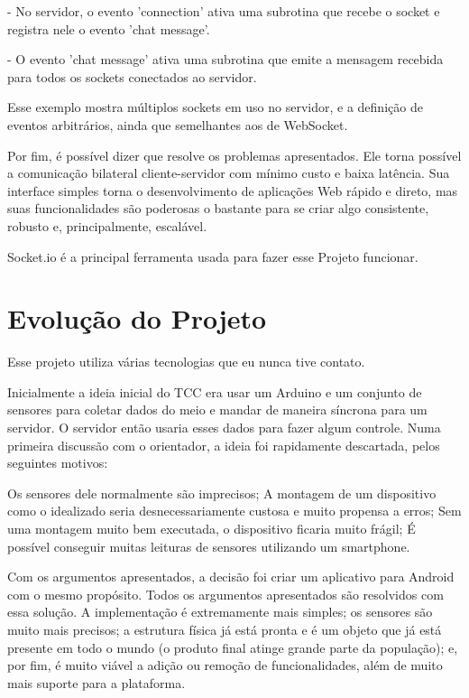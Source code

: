 \documentclass[a4paper,12pt]{article}
\begin{document}
- No servidor, o evento 'connection' ativa uma subrotina que recebe o socket e registra nele o evento 'chat message'.

- O evento 'chat message' ativa uma subrotina que emite a mensagem recebida para todos os sockets conectados ao servidor.

Esse exemplo mostra múltiplos sockets em uso no servidor, e a definição de eventos arbitrários, ainda que semelhantes aos de WebSocket.

Por fim, é possível dizer que resolve os problemas apresentados. Ele torna possível a comunicação bilateral cliente-servidor com mínimo custo e baixa latência. Sua interface simples torna o desenvolvimento de aplicações Web rápido e direto, mas suas funcionalidades são poderosas o bastante para se criar algo consistente, robusto e, principalmente, escalável.

Socket.io é a principal ferramenta usada para fazer esse Projeto funcionar.

\newpage

\section{Evolução do Projeto}

Esse projeto utiliza várias tecnologias que eu nunca tive contato.


Inicialmente a ideia inicial do TCC era usar um Arduino e um conjunto de sensores para coletar dados do meio e mandar de maneira síncrona para um servidor. O servidor então usaria esses dados para fazer algum controle. Numa primeira discussão com o orientador, a ideia foi rapidamente descartada, pelos seguintes motivos:

Os sensores dele normalmente são imprecisos;
A montagem de um dispositivo como o idealizado seria desnecessariamente custosa e muito propensa a erros;
Sem uma montagem muito bem executada, o dispositivo ficaria muito frágil;
É possível conseguir muitas leituras de sensores utilizando um smartphone.


Com os argumentos apresentados, a decisão foi criar um aplicativo para Android com o mesmo propósito. Todos os argumentos apresentados são resolvidos com essa solução. A implementação é extremamente mais simples; os sensores são muito mais precisos; a estrutura física já está pronta e é um objeto que já está presente em todo o mundo (o produto final atinge grande parte da população); e, por fim, é muito viável a adição ou remoção de funcionalidades, além de muito mais suporte para a plataforma.
\end{document}
